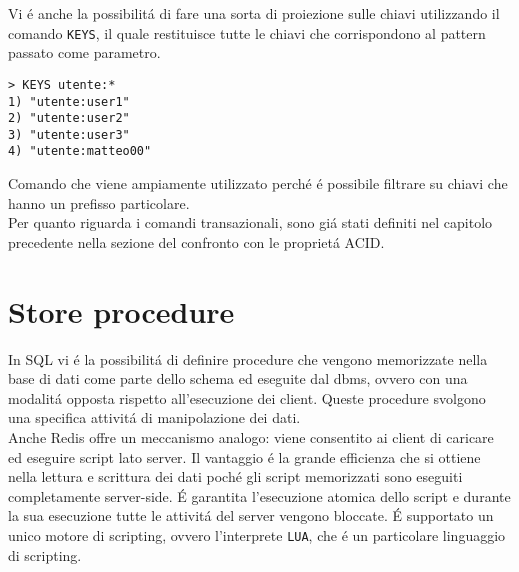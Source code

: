 Vi é anche la possibilitá di fare una sorta di proiezione sulle chiavi utilizzando il comando \texttt{KEYS}, il quale restituisce tutte le chiavi che corrispondono al pattern passato come parametro.
\begin{lstlisting}[autogobble]
> KEYS utente:*
1) "utente:user1"
2) "utente:user2"
3) "utente:user3"
4) "utente:matteo00"
\end{lstlisting}
Comando che viene ampiamente utilizzato perché é possibile filtrare su chiavi che hanno un prefisso particolare.\\

Per quanto riguarda i comandi transazionali, sono giá stati definiti nel capitolo precedente nella sezione del confronto con le proprietá ACID.

\section{Store procedure}
In SQL vi é la possibilitá di definire procedure che vengono memorizzate nella base di dati come parte dello schema ed eseguite dal dbms,
ovvero con una modalitá opposta rispetto all'esecuzione dei client. Queste procedure svolgono una specifica attivitá di manipolazione dei dati.\\
Anche Redis offre un meccanismo analogo: viene consentito ai client di caricare ed eseguire script lato server.
Il vantaggio é la grande efficienza che si ottiene nella lettura e scrittura dei dati poché gli script
memorizzati sono eseguiti completamente server-side.
É garantita l'esecuzione atomica dello script e durante la sua esecuzione tutte le attivitá del server vengono bloccate.
É supportato un unico motore di scripting, ovvero l'interprete \texttt{LUA}, che é un particolare linguaggio di scripting.

